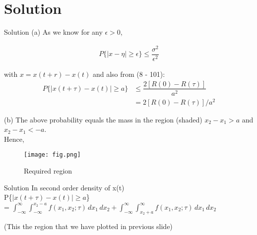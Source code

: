 \documentclass[15pt]{beamer}
\begin{document}
    \section{Solution}
    \begin{frame}{Solution}
        (a) As we know for any $\epsilon > 0$,
        \begin{center}
            \begin{align}
                P\{|x - \eta| \geq \epsilon \} \leq \dfrac{\sigma^2}{\epsilon^2}
            \end{align}
        \end{center}
        with $x = x(t + r) - x(t)$ and also from (8 - 101):
        \begin{align}
            P\{|x(t + \tau) - x(t)| \geq a \} &\leq \dfrac{2[R(0) - R(\tau)]}{a^2} \\
            &= 2[R(0) - R(\tau)]/a^2
        \end{align}
    \end{frame}
    \begin{frame}
        (b)
        The above probability equals the mass in the region (shaded) $x_2 - x_1 > a$ and $x_2 - x_1 < -a$.\\
        Hence,
    \end{frame}
    \begin{frame}
        \begin{figure}[h]
            \centering
            \texttt{[image: fig.png]}
            \caption{Required region}
            \label{fig.}
        \end{figure}
    \end{frame}
    \begin{frame}{Solution}
        In second order density of x(t)\\
        P\{$|x(t + \tau) - x(t)| \geq a $\} \\

        = $\int_{-\infty}^{\infty}\int_{-\infty}^{x_2 - a} f(x_1,x_2;\tau) \,dx_1\,dx_2 + \int_{-\infty}^{\infty}\int_{x_2 + a}^{\infty} f(x_1,x_2;\tau) \,dx_1\,dx_2$

         (This the region that we have plotted in previous slide)
    \end{frame}
\end{document}
